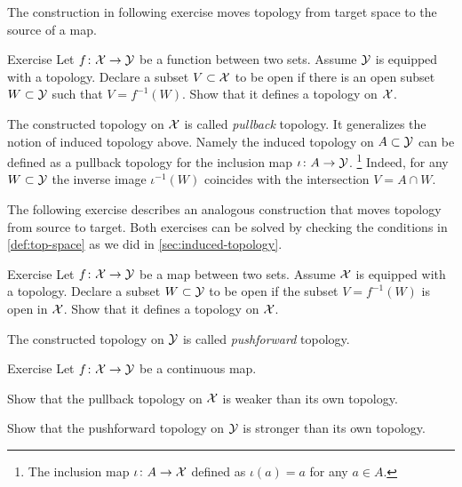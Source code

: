 The construction in following exercise moves topology from target space to the source of a map.

\begin{thm}{Exercise}\label{ex:move-topology:pullback}
Let $f\colon\mathcal{X}\to\mathcal{Y}$ be a function between two sets.
Assume $\mathcal{Y}$ is equipped with a topology.
Declare a subset $V\subset\mathcal{X}$  to be open if there is an open subset $W\subset\mathcal{Y}$ 
such that $V=f^{-1}(W)$.
Show that it defines a topology on $\mathcal{X}$.
\end{thm}

The constructed topology on $\mathcal{X}$ is called \emph{pullback} topology.
It generalizes the notion of induced topology above.
Namely the induced topology on $A\subset \mathcal{Y}$ can be defined as a pullback topology for the inclusion map $\iota\colon A\to \mathcal{Y}$.%
\footnote{The inclusion map $\iota\colon A\to \mathcal{X}$ defined as $\iota(a)=a$ for any $a\in A$.}
Indeed, for any $W\subset \mathcal{Y}$ the inverse image $\iota^{-1}(W)$ coincides with the intersection  $V=A\cap W$.

The following exercise describes an analogous construction that moves topology from source to target.
Both exercises can be solved by checking the conditions in \ref{def:top-space} as we did in \ref{sec:induced-topology}.

\begin{thm}{Exercise}\label{ex:move-topology:pushforward}
Let $f\colon\mathcal{X}\to\mathcal{Y}$ be a map between two sets.
Assume $\mathcal{X}$ is equipped with a topology.
Declare a subset $W\subset\mathcal{Y}$ to be open if the subset $V=f^{-1}(W)$ is open in $\mathcal{X}$.
Show that it defines a topology on $\mathcal{X}$.

\end{thm}

The constructed topology on $\mathcal{Y}$ is called \emph{pushforward} topology.

\begin{thm}{Exercise}
Let $f\colon\mathcal{X}\to\mathcal{Y}$ be a continuous map.

\begin{subthm}{}
Show that the pullback topology on $\mathcal{X}$ is weaker than its own topology.
\end{subthm}

\begin{subthm}{}
Show that the pushforward topology on $\mathcal{Y}$ is stronger than its own topology.
\end{subthm}

\end{thm}

